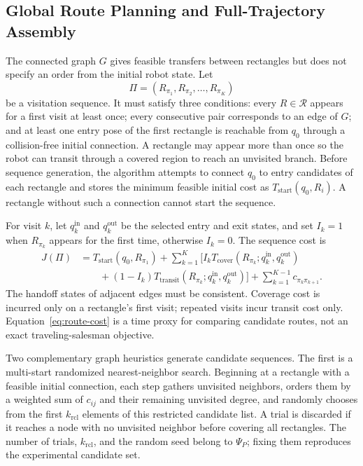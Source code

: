 \subsection{Global Route Planning and Full-Trajectory Assembly}

The connected graph $G$ gives feasible transfers between rectangles but does not specify an order from the initial robot state. Let
\begin{equation}
\Pi=(R_{\pi_1},R_{\pi_2},\ldots,R_{\pi_K})
\tag{20}
\label{eq:visit-sequence}
\end{equation}
be a visitation sequence. It must satisfy three conditions: every $R\in\mathcal R$ appears for a first visit at least once; every consecutive pair corresponds to an edge of $G$; and at least one entry pose of the first rectangle is reachable from $q_0$ through a collision-free initial connection. A rectangle may appear more than once so the robot can transit through a covered region to reach an unvisited branch. Before sequence generation, the algorithm attempts to connect $q_0$ to entry candidates of each rectangle and stores the minimum feasible initial cost as $T_{\mathrm{start}}(q_0,R_i)$. A rectangle without such a connection cannot start the sequence.

For visit $k$, let $q_k^{\mathrm{in}}$ and $q_k^{\mathrm{out}}$ be the selected entry and exit states, and set $I_k=1$ when $R_{\pi_k}$ appears for the first time, otherwise $I_k=0$. The sequence cost is
\begin{equation}
\begin{aligned}
J(\Pi)&=T_{\mathrm{start}}(q_0,R_{\pi_1})
+\sum_{k=1}^{K}\bigl[I_kT_{\mathrm{cover}}(R_{\pi_k};q_k^{\mathrm{in}},q_k^{\mathrm{out}})\\
&\qquad +(1-I_k)T_{\mathrm{transit}}(R_{\pi_k};q_k^{\mathrm{in}},q_k^{\mathrm{out}})\bigr]
+\sum_{k=1}^{K-1}c_{\pi_k\pi_{k+1}}.
\end{aligned}
\tag{21}
\label{eq:route-cost}
\end{equation}
The handoff states of adjacent edges must be consistent. Coverage cost is incurred only on a rectangle's first visit; repeated visits incur transit cost only. Equation~\eqref{eq:route-cost} is a time proxy for comparing candidate routes, not an exact traveling-salesman objective.

Two complementary graph heuristics generate candidate sequences. The first is a multi-start randomized nearest-neighbor search. Beginning at a rectangle with a feasible initial connection, each step gathers unvisited neighbors, orders them by a weighted sum of $c_{ij}$ and their remaining unvisited degree, and randomly chooses from the first $k_{\mathrm{rcl}}$ elements of this restricted candidate list. A trial is discarded if it reaches a node with no unvisited neighbor before covering all rectangles. The number of trials, $k_{\mathrm{rcl}}$, and the random seed belong to $\Psi_P$; fixing them reproduces the experimental candidate set.

